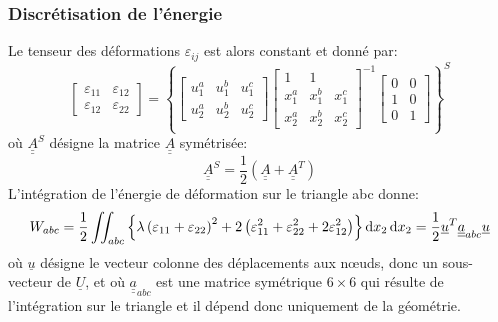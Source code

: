 \subsubsection{Discrétisation de l'énergie}
Le tenseur des déformations $\varepsilon_{ij}$ est alors constant et donné par:
\begin{equation}
    \begin{bmatrix}
        \varepsilon_{11} & \varepsilon_{12} \\
        \varepsilon_{12} & \varepsilon_{22}
    \end{bmatrix}
    =
    \left\{ 
    \begin{bmatrix}
        u_1^a & u_1^b & u_1^c \\
        u_2^a & u_2^b & u_2^c
    \end{bmatrix}
    \begin{bmatrix}
        1 & 1 & \\
        x_1^a & x_1^b & x_1^c \\
        x_2^a & x_2^b & x_2^c
    \end{bmatrix}^{-1}
    \begin{bmatrix}
        0 & 0 \\
        1 & 0 \\
        0 & 1
    \end{bmatrix}
    \right\}^S
    \label{eq:Ch09-076}
\end{equation}
où $\underline{\underline{A}}^S$ désigne la matrice $\underline{\underline{A}}$ symétrisée:
\begin{equation}
    \underline{\underline{A}}^S = \frac{1}{2} \left( \underline{\underline{A}} + \underline{\underline{A}}^T \right)
    \label{eq:Ch09-077}
\end{equation}
L'intégration de l'énergie de déformation sur le triangle abc donne:
\begin{equation}
        W_{abc} = \frac{1}{2} \iint_{abc} \left\{ \lambda \left( \varepsilon_{11} + \varepsilon_{22} \right)^2 + 2 \left( \varepsilon_{11}^2 + \varepsilon_{22}^2 + 2 \varepsilon_{12}^2 \right) \right\} \mathop{\mathrm{{}d}}\mathopen{} x_2 \mathop{\mathrm{{}d}}\mathopen{} x_2
        = \frac{1}{2} \underline{u}^T \underline{\underline{a}}_{abc} \underline{u}
    \label{eq:Ch09-078}
\end{equation}
où $\underline{u}$ désigne le vecteur colonne des déplacements  aux nœuds, donc un sous-vecteur de $\underline{U}$, et où $\underline{\underline{a}}_{abc}$ est une matrice symétrique $6\times6$ qui résulte de l'intégration sur le triangle et il dépend donc uniquement de la géométrie.

